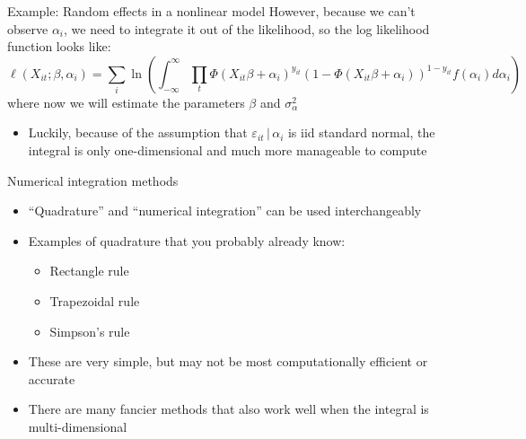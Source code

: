 \documentclass[english,xcolor=dvipsnames]{beamer}
\begin{document}
\begin{frame}{Example: Random effects in a nonlinear model}
However, because we can't observe $\alpha_i$, we need to integrate it out of the likelihood, so the log likelihood function looks like:
\begin{equation*}
\ell(X_{it};\beta,\alpha_{i})=\sum_{i}\ln\left(\int_{-\infty}^{\infty}\prod_{t}\Phi\left(X_{it}\beta+\alpha_{i}\right)^{y_{it}}\left(1-\Phi\left(X_{it}\beta+\alpha_{i}\right)\right)^{1-y_{it}}f\left(\alpha_{i}\right)d\alpha_{i}\right)
\end{equation*}
where now we will estimate the parameters $\beta$ and $\sigma_{\alpha}^{2}$
\begin{itemize}
	\item Luckily, because of the assumption that $\varepsilon_{it}\,\vert\,\alpha_{i}$ is iid standard normal, the integral is only one-dimensional and much more manageable to compute
\end{itemize}
\end{frame}

\begin{frame}{Numerical integration methods}
\begin{itemize}
	\item ``Quadrature'' and ``numerical integration'' can be used interchangeably
	\item Examples of quadrature that you probably already know:
	\begin{itemize}
		\item Rectangle rule
		\item Trapezoidal rule
		\item Simpson's rule
	\end{itemize}
	\item These are very simple, but may not be most computationally efficient or accurate
	\item There are many fancier methods that also work well when the integral is multi-dimensional
\end{itemize}
\end{frame}
\end{document}
